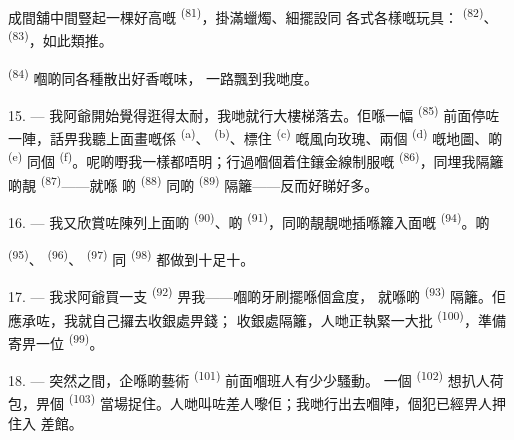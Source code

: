 成間舖中間豎起一棵好高嘅 \textsuperscript{(81)}，掛滿蠟燭、細擺設同
各式各樣嘅玩具： \textsuperscript{(82)}、 \textsuperscript{(83)}，如此類推。

 \textsuperscript{(84)} 嗰啲同各種散出好香嘅味，
一路飄到我哋度。

\VUsaut{3.4mm}
\VUsaut{2.8mm}

15. --- 我阿爺開始覺得逛得太耐，我哋就行大樓梯落去。佢喺一幅
 \textsuperscript{(85)} 前面停咗一陣，話畀我聽上面畫嘅係
\textsuperscript{(a)}、 \textsuperscript{(b)}、標住
\textsuperscript{(c)} 嘅風向玫瑰、兩個
\textsuperscript{(d)} 嘅地圖、啲 \textsuperscript{(e)} 同個
\textsuperscript{(f)}。呢啲嘢我一樣都唔明；行過嗰個着住鑲金線制服嘅
 \textsuperscript{(86)}，同埋我隔籬啲靚 \textsuperscript{(87)}——就喺
啲 \textsuperscript{(88)} 同啲 \textsuperscript{(89)} 隔籬——反而好睇好多。

16. --- 我又欣賞咗陳列上面啲 \textsuperscript{(90)}、啲
\textsuperscript{(91)}，同啲靚靚哋插喺籮入面嘅 \textsuperscript{(94)}。啲

 \textsuperscript{(95)}、 \textsuperscript{(96)}、
 \textsuperscript{(97)} 同 \textsuperscript{(98)} 都做到十足十。

\VUsaut{4.4mm}
\VUsaut{2.8mm}

17. --- 我求阿爺買一支 \textsuperscript{(92)} 畀我——嗰啲牙刷擺喺個盒度，
就喺啲 \textsuperscript{(93)} 隔籬。佢應承咗，我就自己攞去收銀處畀錢；
收銀處隔籬，人哋正執緊一大批 \textsuperscript{(100)}，準備寄畀一位
 \textsuperscript{(99)}。

18. --- 突然之間，企喺啲藝術 \textsuperscript{(101)} 前面嗰班人有少少騷動。
一個 \textsuperscript{(102)} 想扒人荷包，畀個 \textsuperscript{(103)}
當場捉住。人哋叫咗差人嚟佢；我哋行出去嗰陣，個犯已經畀人押住入
差館。

\VUsaut{6.0mm}
\VUfilet{22mm}
